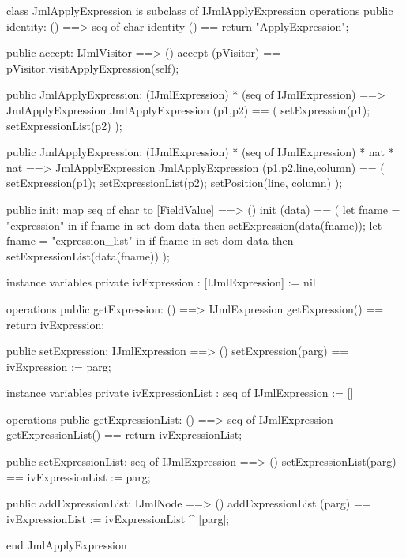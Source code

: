 \begin{vdm_al}
class JmlApplyExpression is subclass of IJmlApplyExpression
operations
  public identity: () ==> seq of char
  identity () == return "ApplyExpression";

  public accept: IJmlVisitor ==> ()
  accept (pVisitor) == pVisitor.visitApplyExpression(self);

  public JmlApplyExpression:
    (IJmlExpression) *
    (seq of IJmlExpression) ==> JmlApplyExpression
  JmlApplyExpression (p1,p2) == 
    ( setExpression(p1);
      setExpressionList(p2) );

  public JmlApplyExpression:
    (IJmlExpression) *
    (seq of IJmlExpression) *
    nat *
    nat ==> JmlApplyExpression
  JmlApplyExpression (p1,p2,line,column) == 
    ( setExpression(p1);
      setExpressionList(p2);
      setPosition(line, column) );

  public init: map seq of char to [FieldValue] ==> ()
  init (data) ==
    ( let fname = "expression" in
        if fname in set dom data
        then setExpression(data(fname));
      let fname = "expression_list" in
        if fname in set dom data
        then setExpressionList(data(fname)) );

instance variables
  private ivExpression : [IJmlExpression] := nil

operations
  public getExpression: () ==> IJmlExpression
  getExpression() == return ivExpression;

  public setExpression: IJmlExpression ==> ()
  setExpression(parg) == ivExpression := parg;

instance variables
  private ivExpressionList : seq of IJmlExpression := []

operations
  public getExpressionList: () ==> seq of IJmlExpression
  getExpressionList() == return ivExpressionList;

  public setExpressionList: seq of IJmlExpression ==> ()
  setExpressionList(parg) == ivExpressionList := parg;

  public addExpressionList: IJmlNode ==> ()
  addExpressionList (parg) == ivExpressionList := ivExpressionList ^ [parg];

end JmlApplyExpression
\end{vdm_al}

